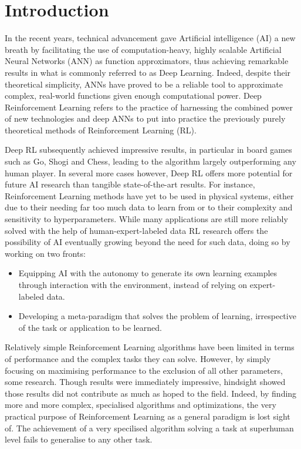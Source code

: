 \section{Introduction}

In the recent years, technical advancement gave Artificial intelligence (AI) a new breath by facilitating the use of computation-heavy, highly scalable Artificial Neural Networks (ANN) as function approximators, thus achieving remarkable results in what is commonly referred to as Deep Learning. Indeed, despite their theoretical simplicity, ANNs have proved to be a reliable tool to approximate complex, real-world functions given enough computational power. Deep Reinforcement Learning refers to the practice of harnessing the combined power of new technologies and deep ANNs to put into practice the previously purely theoretical methods of Reinforcement Learning (RL). 

Deep RL subsequently achieved impressive results, in particular in board games such as Go, Shogi and Chess, leading to the algorithm largely outperforming any human player. In several more cases however, Deep RL offers more potential for future AI research than tangible state-of-the-art results. For instance, Reinforcement Learning methods have yet to be used in physical systems, either due to their needing far too much data to learn from %
or to their complexity and sensitivity to hyperparameters. %
While many applications are still more reliably solved with the help of human-expert-labeled data %
RL research offers the possibility of AI eventually growing beyond the need for such data, doing so by working on two fronts:
\begin{itemize}
\item Equipping AI with the autonomy to generate its own learning examples through interaction with the environment, instead of relying on expert-labeled data.
\item Developing a meta-paradigm that solves the problem of learning, irrespective of the task or application to be learned.
\end{itemize}

Relatively simple Reinforcement Learning algorithms have been limited in terms of performance and the complex tasks they can solve. However, by simply focusing on maximising performance to the exclusion of all other parameters, some research. Though results were immediately impressive, hindsight showed those results did not contribute as much as hoped to the field. Indeed, by finding more and more complex, specialised algorithms and optimizations, the very practical purpose of Reinforcement Learning as a general paradigm is lost sight of. The achievement of a very specilised algorithm solving a task at superhuman level fails to generalise to any other task. %

